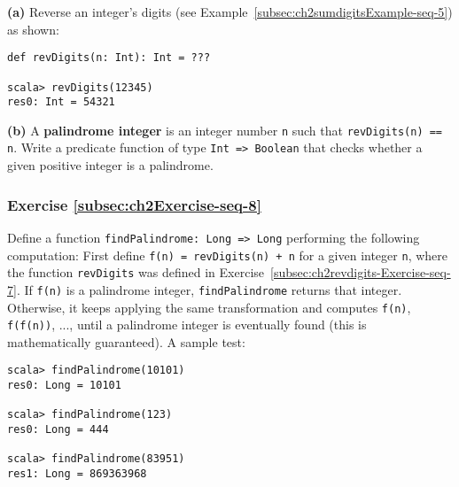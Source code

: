 \textbf{(a)} Reverse an integer's digits (see Example~\ref{subsec:ch2sumdigitsExample-seq-5})
as shown:
\begin{lstlisting}
def revDigits(n: Int): Int = ???

scala> revDigits(12345)
res0: Int = 54321
\end{lstlisting}
\textbf{(b)} A \textbf{palindrome integer}
is an integer number \lstinline!n! such that \lstinline!revDigits(n) == n!.
Write a predicate function of type \lstinline!Int => Boolean! that
checks whether a given positive integer is a palindrome.%
\begin{comment}
Solution:
\begin{lstlisting}
def digitsOf(n: Int): Seq[Int] = Stream.iterate(n)(_ / 10).takeWhile(_ != 0).map(_ % 10).toList
def revDigits(n: Int): Int = digitsOf(n).foldLeft(0){case (acc, d) => acc*10+d }
def isPalindrome(n: Int): Boolean = revDigits(n) == n
\end{lstlisting}
\end{comment}


\subsubsection{Exercise \label{subsec:ch2Exercise-seq-8}\ref{subsec:ch2Exercise-seq-8}}

Define a function \lstinline!findPalindrome: Long => Long! performing
the following computation: First define \lstinline!f(n) = revDigits(n) + n!
for a given integer \lstinline!n!, where the function \lstinline!revDigits!
was defined in Exercise~\ref{subsec:ch2revdigits-Exercise-seq-7}.
If \lstinline!f(n)! is a palindrome integer, \lstinline!findPalindrome!
returns that integer. Otherwise, it keeps applying the same transformation
and computes \lstinline!f(n)!, \lstinline!f(f(n))!, ..., until a
palindrome integer is eventually found (this is mathematically guaranteed).
A sample test:
\begin{lstlisting}
scala> findPalindrome(10101)
res0: Long = 10101

scala> findPalindrome(123)
res0: Long = 444

scala> findPalindrome(83951)
res1: Long = 869363968
\end{lstlisting}
\begin{comment}
Solution:
\begin{lstlisting}
def findPalindrome(n: Int): Int = Stream.iterate(n) {x => x + revDigits(x)}.filter(isPalindrome).take(1).toList.head
\end{lstlisting}
\end{comment}


